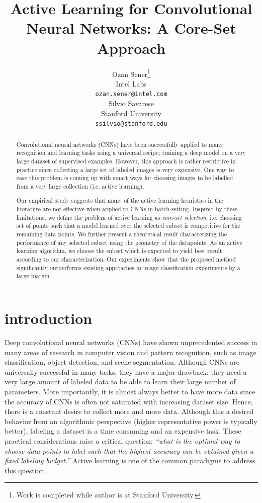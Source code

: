 \documentclass{article} %
\title{Active Learning for Convolutional Neural Networks: A Core-Set Approach}
\author{Ozan Sener\thanks{ Work is completed while author is at Stanford University.} \\
Intel Labs \\
\texttt{ozan.sener@intel.com} \\
\And
Silvio Savarese\\
Stanford University \\
\texttt{ssilvio@stanford.edu} 
}
\makeatletter
\newcommand*{\ie}{i.e.\@\xspace}
\makeatother
\begin{document}
\maketitle

\begin{abstract} 
Convolutional neural networks (CNNs) have been successfully applied to many recognition and learning tasks using a universal recipe;
    training a deep model on a very large dataset of supervised examples. However, this approach is rather restrictive in practice since collecting a
    large set of labeled images is very expensive. One way to ease this problem is coming up with smart ways for choosing images to be labelled from a
    very large collection (\ie active learning).

    Our empirical study suggests that many of the active learning heuristics in the literature are not effective when applied to CNNs in batch setting. Inspired by these limitations, we define the problem of active learning as \emph{core-set selection}, \ie choosing set of points such that a model learned over the selected subset is competitive for the remaining data points. We further present a theoretical result characterizing the performance of any selected subset using the geometry of the datapoints. As an active learning algorithm, we choose the subset which is expected to yield best result according to our characterization. Our experiments show that the proposed method significantly outperforms existing approaches in image classification experiments by a large margin. 
\end{abstract} 

\section{introduction}
Deep convolutional neural networks (CNNs) have shown unprecedented success in many areas of research in computer vision and pattern recognition, such as
image classification, object detection, and scene segmentation. Although CNNs are universally successful in many tasks, they have a major drawback;
they need a very large amount of labeled data to be able to learn their large number of parameters. More importantly, it is almost always better to have
more data since the accuracy of CNNs is often not saturated with increasing dataset size. Hence, there is a constant desire to collect more and more
data. Although this a desired behavior from an algorithmic perspective (higher representative power is typically better), labeling a dataset is
a time consuming and an expensive task. These practical considerations raise a critical question: \emph{``what is the optimal way to choose data
points to label such that the highest accuracy can be obtained given a fixed labeling budget.''} Active learning is one of the common paradigms to
address this question.
\end{document}
